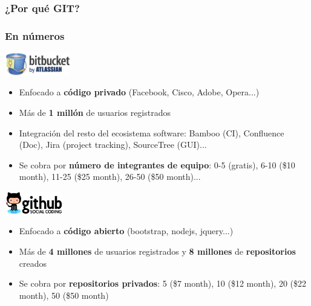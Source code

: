 \frame
{
\frametitle{¿Por qué GIT?}
}
\usebackgroundtemplate{}
\frame
{
\frametitle{En números}
\includegraphics[height=1cm]{imgs/git-bitbucket.png}
\begin{itemize}
 \item Enfocado a \textbf{código privado} (Facebook, Cisco, Adobe, Opera...)
 \item Más de \textbf{1 millón} de usuarios registrados
 \item Integración del resto del ecosistema software: Bamboo (CI), Confluence (Doc), Jira (project tracking), SourceTree (GUI)...
 \item Se cobra por \textbf{número de integrantes de equipo}: 0-5 (gratis), 6-10 (\$10 month), 11-25 (\$25 month), 26-50 (\$50 month)...
\end{itemize}

\includegraphics[height=1cm]{imgs/git-github.png}
\begin{itemize}
 \item Enfocado a \textbf{código abierto} (bootstrap, nodejs, jquery...)
 \item Más de \textbf{4 millones} de usuarios registrados y \textbf{8 millones} de \textbf{repositorios} creados
 \item Se cobra por \textbf{repositorios privados}: 5 (\$7 month), 10 (\$12 month), 20 (\$22 month), 50 (\$50 month)
\end{itemize}
}
